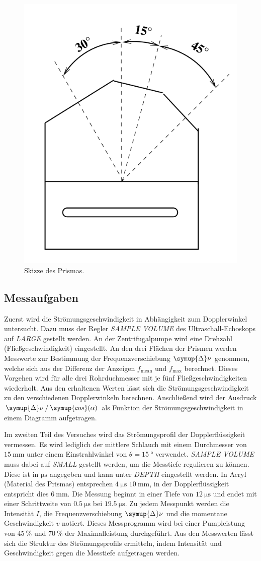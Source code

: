 \begin{figure}
    \centering
    \includegraphics[width=.2\textwidth]{content/Prisma.png}
    \caption{Skizze des Prismas.}
    \label{fig:Prisma}
\end{figure}  

\subsection{Messaufgaben}
\label{subsec:Messaufgaben}
Zuerst wird die Strömungsgeschwindigkeit in Abhängigkeit zum Dopplerwinkel untersucht. Dazu muss der Regler \textit{SAMPLE VOLUME} des Ultraschall-Echoskops auf \textit{LARGE}
gestellt werden. An der Zentrifugalpumpe wird eine Drehzahl (Fließgeschwindigkeit) eingestellt. An den drei Flächen der Prismen werden Messwerte zur Bestimmung der 
Frequenzverschiebung $\symup{\Delta}\nu$ genommen, welche sich aus der Differenz der Anzeigen $f_\text{mean}$ und $f_\text{max}$ berechnet. Dieses Vorgehen wird für alle 
drei Rohrduchmesser mit je fünf Fließgeschwindigkeiten wiederholt. Aus den erhaltenen Werten lässt sich die Strömungsgeschwindigkeit zu den verschiedenen Dopplerwinkeln
berechnen. Anschließend wird der Ausdruck $\symup{\Delta}\nu \mathbin{/} \symup{cos}(\alpha)$ als Funktion der Strömungsgeschwindigkeit in einem Diagramm aufgetragen.
 
Im zweiten Teil des Versuches wird das Strömungsprofil der Dopplerflüssigkeit vermessen. Es wird lediglich der mittlere Schlauch mit einem Durchmesser von 
$\qty{15}{\milli\metre}$ unter einem Einstrahlwinkel von $\theta = \qty{15}{\degree}$ verwendet. \textit{SAMPLE VOLUME} muss dabei auf \textit{SMALL} gestellt werden,
um die Messtiefe regulieren zu können. Diese ist in $\unit{\micro\second}$ angegeben und kann unter \textit{DEPTH} eingestellt werden. In Acryl (Material des Prismas) 
entsprechen $\qty{4}{\micro\second}$ $\qty{10}{\milli\metre}$, in der Dopplerflüssigkeit entspricht dies $\qty{6}{\milli\metre}$. Die Messung beginnt in einer Tiefe
von $\qty{12}{\micro\second}$ und endet mit einer Schrittweite von $\qty{0.5}{\micro\second}$ bei $\qty{19.5}{\micro\second}$. Zu jedem Messpunkt werden die 
Intensität $I$, die Frequenzverschiebung $\symup{\Delta}\nu$ und die momentane Geschwindigkeit $v$ notiert. 
Dieses Messprogramm wird bei einer Pumpleistung von $\qty{45}{\percent}$ und $\qty{70}{\percent}$ der Maximalleistung durchgeführt.
Aus den Messwerten lässt sich die Struktur des Strömungsprofils ermitteln, indem Intensität und Geschwindigkeit gegen die Messtiefe aufgetragen werden.
